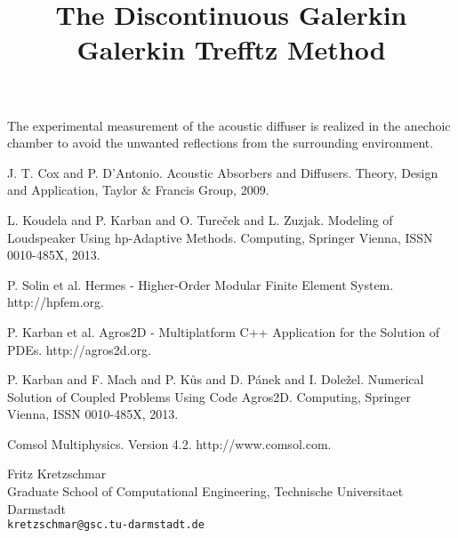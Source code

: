 \documentclass[article,A4,11pt]{llncs}%
\begin{document}
The experimental measurement of the acoustic diffuser is realized in the anechoic chamber to avoid the unwanted reflections from the surrounding environment.


\begin{thebibliography}{10}
{\sc  J. T. Cox and P. D’Antonio}. {Acoustic Absorbers and Diffusers}. Theory, Design and Application, Taylor \& Francis Group, 2009.

{\sc L. Koudela and P. Karban and O. Tureček and L. Zuzjak}. {Modeling of Loudspeaker Using hp-Adaptive Methods}. Computing, Springer Vienna, ISSN 0010-485X, 2013.

{\sc P. Solin et al}. {Hermes - Higher-Order Modular Finite Element System}. http://hpfem.org.

{\sc P. Karban et al}. {Agros2D - Multiplatform C++ Application for the Solution of PDEs}. http://agros2d.org.

{\sc P. Karban and F. Mach and P. Kůs and D. Pánek and I. Doležel}. {Numerical Solution of Coupled Problems Using Code Agros2D}. Computing, Springer Vienna, ISSN 0010-485X, 2013.

{\sc Comsol Multiphysics}. {Version 4.2}. http://www.comsol.com.
\end{thebibliography}

\title{The Discontinuous Galerkin Galerkin Trefftz Method}
 \author{} \institute{}
\maketitle
\begin{center}
{\large Fritz Kretzschmar}\\
Graduate School of Computational Engineering,  Technische Universitaet Darmstadt\\
{\tt kretzschmar@gsc.tu-darmstadt.de}
\end{center}
\end{document}
